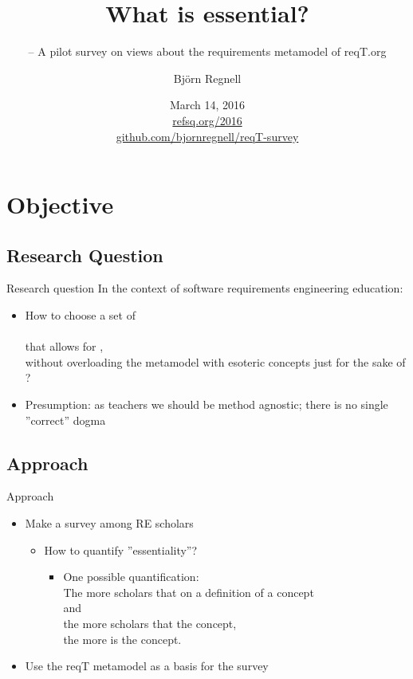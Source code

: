\documentclass{slides}
\title[What is essential?]{What is essential?}
\subtitle{\footnotesize -- A pilot survey on views about the requirements metamodel of reqT.org}
\author{Björn Regnell}
\institute{Lund University}
\date{March 14, 2016\\ \href{http://refsq.org/2016}{refsq.org/2016}\\ \href{https://github.com/bjornregnell/reqT-survey}{github.com/bjornregnell/reqT-survey}}
\begin{document}
\frame{\titlepage}
\frame{\tableofcontents}

\section{Objective}
\subsection{Research Question}
\begin{Slide}{Research question}
In the context of software requirements engineering education:
\begin{itemize}
\item How to choose a set of \\  \\ that allows for , \\ without overloading the metamodel with esoteric concepts just for the sake of ?
\pause
\item Presumption: as teachers we should be method agnostic; there is no single ''correct'' dogma
\end{itemize}
\end{Slide}
\subsection{Approach}
\begin{Slide}{Approach}
\begin{itemize}

\item Make a survey among RE scholars
\pause
\begin{itemize}
\item How to quantify ''essentiality''?
\pause
\begin{itemize}
\item One possible quantification: \\ The more scholars that  on a definition of a concept \\ and \\ the more scholars that  the concept, \\ the more  is the concept.
\end{itemize}
\end{itemize}
\pause
\item Use the reqT metamodel as a basis for the survey
\end{itemize}
\end{Slide}
\end{document}
